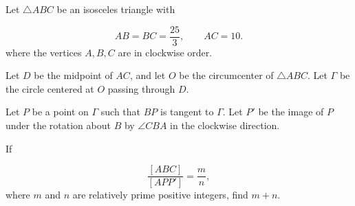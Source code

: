 Let $\triangle ABC$ be an isosceles triangle  with

\[
AB = BC = \dfrac{25}{3}, \qquad AC = 10.
\]where the vertices $A,B,C$ are in clockwise order.

Let $D$ be the midpoint of $AC$, and let $O$ be the circumcenter of $\triangle ABC$. Let $\Gamma$ be the circle centered at $O$ passing through $D$.



Let $P$ be a point on $\Gamma$ such that $BP$ is tangent to $\Gamma$. Let $P'$ be the image of $P$ under the rotation about $B$ by $\angle CBA$ in the clockwise direction.



If

\[
\dfrac{[ABC]}{[APP']}=\dfrac{m}{n},
\]where $m$ and $n$ are relatively prime positive integers, find $m+n$.
